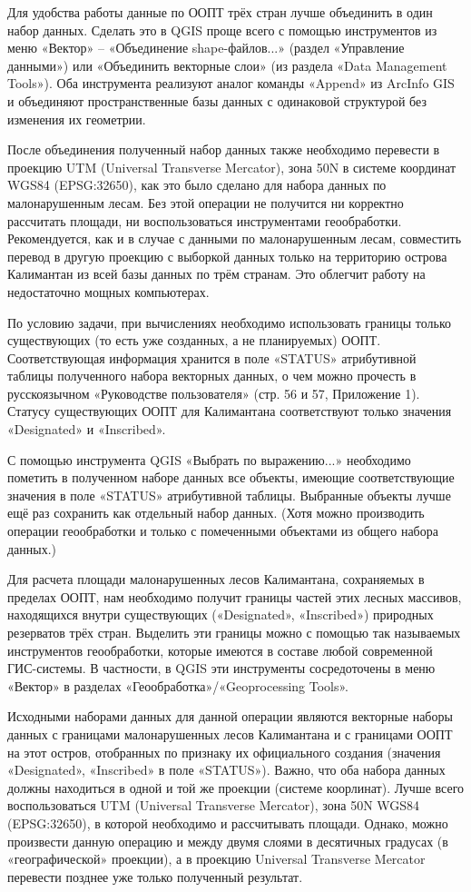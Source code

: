 Для удобства работы данные по ООПТ трёх стран лучше объединить в один набор данных. Сделать это в QGIS проще всего с помощью инструментов из меню «Вектор» – «Объединение shape-файлов...» (раздел «Управление данными») или «Объединить векторные слои» (из раздела «Data Management Tools»). Оба инструмента реализуют аналог команды «Append» из ArcInfo GIS и объединяют пространственные базы данных с одинаковой структурой без изменения их геометрии.

После объединения полученный набор данных также необходимо перевести в проекцию UTM (Universal Transverse Mercator), зона 50N в системе координат WGS84 (EPSG:32650), как это было сделано для набора данных по малонарушенным лесам. Без этой операции не получится ни корректно рассчитать площади, ни воспользоваться инструментами геообработки. Рекомендуется, как и в случае с данными по малонарушенным лесам, совместить перевод в другую проекцию с выборкой данных только на территорию острова Калимантан из всей базы данных по трём странам. Это облегчит работу на недостаточно мощных компьютерах.

По условию задачи, при вычислениях необходимо использовать границы только существующих (то есть уже созданных, а не планируемых) ООПТ. Соответствующая информация хранится в поле «STATUS» атрибутивной таблицы полученного набора векторных данных, о чем можно прочесть в русскоязычном «Руководстве пользователя» (стр. 56 и 57, Приложение 1). Статусу существующих ООПТ для Калимантана соответствуют только значения «Designated» и «Inscribed».

С помощью инструмента QGIS «Выбрать по выражению...» необходимо пометить в полученном наборе данных все объекты, имеющие соответствующие значения в поле «STATUS» атрибутивной таблицы. Выбранные объекты лучше ещё раз сохранить как отдельный набор данных. (Хотя можно производить операции геообработки и только с помеченными объектами из общего набора данных.)

Для расчета площади малонарушенных лесов Калимантана, сохраняемых в пределах ООПТ, нам необходимо получит границы частей этих лесных массивов, находящихся внутри существующих («Designated», «Inscribed») природных резерватов трёх стран. Выделить эти границы можно с помощью так называемых инструментов геообработки, которые имеются в составе любой современной ГИС-системы. В частности, в QGIS эти инструменты сосредоточены в меню «Вектор» в разделах «Геообработка»/«Geoprocessing Tools».

Исходными наборами данных для данной операции являются векторные наборы данных с границами малонарушенных лесов Калимантана и с границами ООПТ на этот остров, отобранных по признаку их официального создания (значения \linebreak «Designated», «Inscribed» в поле «STATUS»). Важно, что оба набора данных должны находиться в одной и той же проекции (системе коорлинат). Лучше всего воспользоваться UTM (Universal Transverse Mercator), зона 50N WGS84 (EPSG:32650), в которой необходимо и рассчитывать площади. Однако, можно произвести данную операцию и между двумя слоями в десятичных градусах (в «географической» проекции), а в проекцию Universal Transverse Mercator перевести позднее уже только полученный результат.

